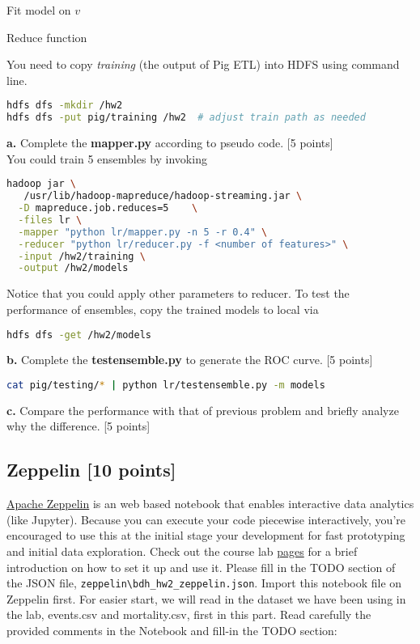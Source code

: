 \documentclass[12pt]{article}
\begin{document}
\begin{algorithm}
Fit model on $v$\;
\caption{Reduce function}\label{algo_reduce}
\end{algorithm}
You need to copy \textit{training} (the output of Pig ETL) into HDFS using command line.
\begin{lstlisting}[language=bash,frame=single]
hdfs dfs -mkdir /hw2
hdfs dfs -put pig/training /hw2  # adjust train path as needed
\end{lstlisting}
\textbf{a.} Complete the \textbf{mapper.py} according to pseudo code. [5 points]\\
You could train 5 ensembles by invoking
\begin{lstlisting}[language=bash,frame=single]
hadoop jar \
   /usr/lib/hadoop-mapreduce/hadoop-streaming.jar \
  -D mapreduce.job.reduces=5    \
  -files lr \
  -mapper "python lr/mapper.py -n 5 -r 0.4" \
  -reducer "python lr/reducer.py -f <number of features>" \
  -input /hw2/training \
  -output /hw2/models
\end{lstlisting}
Notice that you could apply other parameters to reducer. To test the performance of ensembles, copy the trained models to local via
\begin{lstlisting}[language=bash,frame=single]
hdfs dfs -get /hw2/models
\end{lstlisting}
\textbf{b.} Complete the \textbf{testensemble.py} to generate the ROC curve. [5 points]
\begin{lstlisting}[language=bash,frame=single]
cat pig/testing/* | python lr/testensemble.py -m models
\end{lstlisting}
\textbf{c.} Compare the performance with that of previous problem and briefly analyze why the difference. [5 points]

\subsection{Zeppelin [10 points]}
\href{http://zeppelin.apache.org/}{Apache Zeppelin} is an web based notebook that enables interactive data analytics (like Jupyter).
Because you can execute your code piecewise interactively, you're encouraged to use this at the initial stage your development for fast prototyping and initial data exploration. Check out the course lab \href{http://www.sunlab.org/teaching/cse6250/spring2018/lab/zeppelin-intro/}{pages} for a brief introduction on how to set it up and use it. Please fill in the TODO section of the JSON file, \texttt{zeppelin\textbackslash bdh\_hw2\_zeppelin.json}. Import this notebook file on Zeppelin first.
For easier start, we will read in the dataset we have been using in the lab, events.csv and mortality.csv, first in this part. Read carefully the provided comments in the Notebook and fill-in the TODO section:
\end{document}
